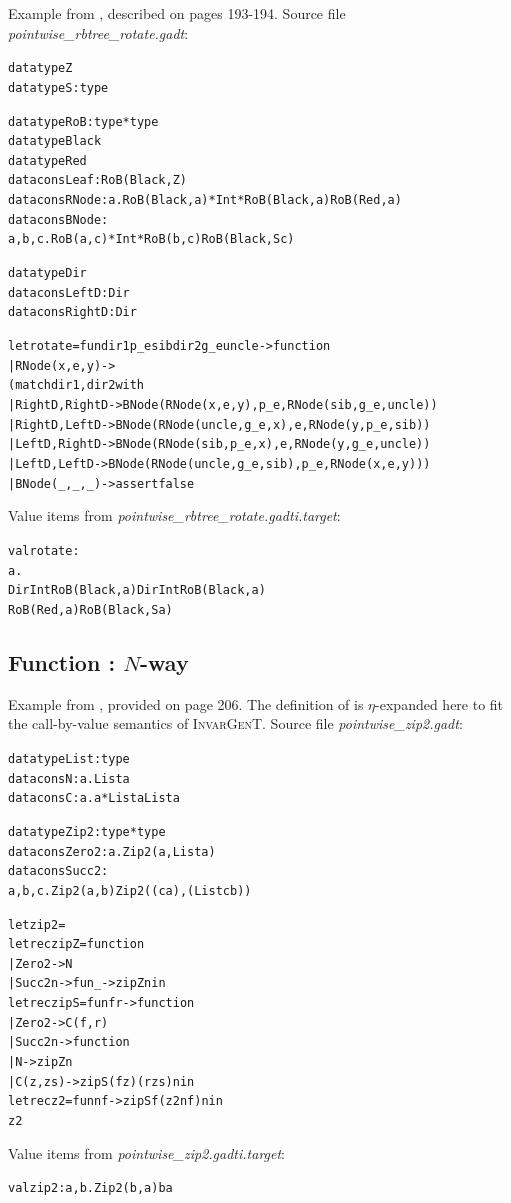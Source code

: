\documentclass{article}
\newcommand{\tmem}[1]{{\em #1\/}}
\newcommand{\tmname}[1]{\textsc{#1}}
\newcommand{\tmverbatim}[1]{{\ttfamily{#1}}}
\newenvironment{tmcode}[1][]{\begin{alltt}}{\end{alltt}}
\begin{document}
Example from {\cite{PracticalGADTsInfer}}, described on pages 193-194. Source
file {\tmem{pointwise\_rbtree\_rotate.gadt}}:
\begin{tmcode}
datatype Z
datatype S : type

datatype RoB : type * type
datatype Black
datatype Red
datacons Leaf : RoB (Black, Z)
datacons RNode : a. RoB (Black, a) * Int * RoB (Black, a)  RoB (Red, a)
datacons BNode :
  a, b, c. RoB (a, c) * Int * RoB (b, c)  RoB (Black, S c)

datatype Dir
datacons LeftD : Dir
datacons RightD : Dir

let rotate = fun dir1 p_e sib dir2 g_e uncle -> function
| RNode (x, e, y) ->
  (match dir1, dir2 with
  | RightD, RightD -> BNode (RNode (x, e, y), p_e, RNode (sib, g_e, uncle))
  | RightD, LeftD -> BNode (RNode (uncle, g_e, x), e, RNode (y, p_e, sib))
  | LeftD, RightD -> BNode (RNode (sib, p_e, x), e, RNode (y, g_e, uncle))
  | LeftD, LeftD -> BNode (RNode (uncle, g_e, sib), p_e, RNode (x, e, y)))
| BNode (_, _, _) -> assert false
\end{tmcode}
Value items from {\tmem{pointwise\_rbtree\_rotate.gadti.target}}:
\begin{tmcode}
val rotate :
   a.
   Dir  Int  RoB (Black, a)  Dir  Int  RoB (Black, a) 
     RoB (Red, a)  RoB (Black, S a)
\end{tmcode}

\subsection{Function \tmverbatim{zip2}: $N$-way \tmverbatim{zip\_with}}

Example from {\cite{PracticalGADTsInfer}}, provided on page 206. The
definition of \tmverbatim{z2} is $\eta$-expanded here to fit the call-by-value
semantics of {\tmname{InvarGenT}}. Source file {\tmem{pointwise\_zip2.gadt}}:
\begin{tmcode}
datatype List : type
datacons N : a. List a
datacons C : a. a * List a  List a

datatype Zip2 : type * type
datacons Zero2 : a. Zip2 (a, List a)
datacons Succ2 :
  a, b, c. Zip2 (a, b)  Zip2 ((c  a), (List c  b))

let zip2 =
  let rec zipZ = function
    | Zero2 -> N
    | Succ2 n -> fun _ -> zipZ n in
  let rec zipS = fun f r -> function
    | Zero2 -> C (f, r)
    | Succ2 n -> function
      | N -> zipZ n
      | C (z, zs) -> zipS (f z) (r zs) n in
  let rec z2 = fun n f -> zipS f (z2 n f) n in
  z2
\end{tmcode}
Value items from {\tmem{pointwise\_zip2.gadti.target}}:
\begin{tmcode}
val zip2 : a, b. Zip2 (b, a)  b  a
\end{tmcode}
\end{document}
